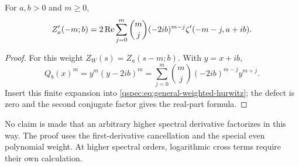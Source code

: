 \begin{corollary}\label{qspec:cor:negative-hurwitz}
For $a,b>0$ and $m\ge0$,
\begin{equation}\label{qspec:eq:negative-hurwitz}
Z_a'(-m;b)=2\operatorname{Re}\sum_{j=0}^m
\binom mj(-2ib)^{m-j}\zeta'(-m-j,a+ib).
\end{equation}
\end{corollary}
\begin{proof}
For this weight $Z_W(s)=Z_a(s-m;b)$. With $y=x+ib$,
\[
Q_b(x)^m=y^m(y-2ib)^m
=\sum_{j=0}^m\binom mj(-2ib)^{m-j}y^{m+j}.
\]
Insert this finite expansion into
\eqref{qspec:eq:general-weighted-hurwitz}; the defect is zero and the
second conjugate factor gives the real-part formula.
\end{proof}
No claim is made that an arbitrary higher spectral derivative factorizes
in this way. The proof uses the first-derivative cancellation and the
special even polynomial weight. At higher spectral orders, logarithmic
cross terms require their own calculation.
